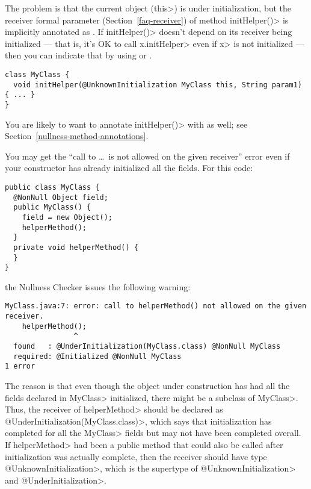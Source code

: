 The problem is that the current object (\<this>) is under initialization,
but the receiver formal parameter (Section~\ref{faq-receiver}) of method
\<initHelper()> is implicitly annotated as
.  If
\<initHelper()> doesn't depend on its receiver being initialized --- that
is, it's OK to call \<x.initHelper> even if \<x> is not initialized ---
then you can indicate that by using
 or
.

\begin{Verbatim}
class MyClass {
  void initHelper(@UnknownInitialization MyClass this, String param1) { ... }
}
\end{Verbatim}

\noindent
You are likely to want to annotate \<initHelper()> with
 as well; see
Section~\ref{nullness-method-annotations}.

You may get the ``call to \ldots\ is not allowed on the given receiver''
error even if your constructor has already initialized all the fields.
For this code:

\begin{Verbatim}
public class MyClass {
  @NonNull Object field;
  public MyClass() {
    field = new Object();
    helperMethod();
  }
  private void helperMethod() {
  }
}
\end{Verbatim}

\noindent
the Nullness Checker issues the following warning:

\begin{Verbatim}
MyClass.java:7: error: call to helperMethod() not allowed on the given receiver.
    helperMethod();
                ^
  found   : @UnderInitialization(MyClass.class) @NonNull MyClass
  required: @Initialized @NonNull MyClass
1 error
\end{Verbatim}

\begin{sloppypar}
The reason is that even though the object under construction has had all
the fields declared in \<MyClass> initialized, there might be a subclass of
\<MyClass>.  Thus, the receiver of \<helperMethod> should be declared as
\<@UnderInitialization(MyClass.class)>, which says that initialization has
completed for all the \<MyClass> fields but may not have been completed
overall.  If \<helperMethod> had been a public method that could also be called after
initialization was actually complete, then the receiver should have type
\<@UnknownInitialization>, which is the supertype of
\<@UnknownInitialization> and \<@UnderInitialization>.
\end{sloppypar}


